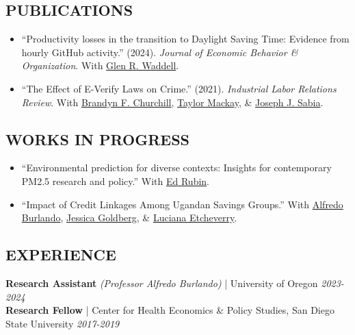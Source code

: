\documentclass[11pt]{article}
\begin{document}

\subsection*{PUBLICATIONS}
\begin{itemize}[itemsep=0ex, topsep=0em, leftmargin=0em]
  \item[] “Productivity losses in the transition to Daylight Saving Time: Evidence from hourly GitHub activity.” (2024). \textit{Journal of Economic Behavior \& Organization}. With \href{https://glenwaddell.com}{Glen R. Waddell}.
  \item[] “The Effect of E-Verify Laws on Crime.” (2021). \textit{Industrial Labor Relations Review}. With \href{https://brandynchurchill.com/}{Brandyn F. Churchill}, \href{https://tmackay.io/}{Taylor Mackay}, \& \href{https://economics.sdsu.edu/faculty/sabia}{Joseph J. Sabia}.
\end{itemize}


\subsection*{WORKS IN PROGRESS}
\begin{itemize}[itemsep=0ex, topsep=0em, leftmargin=0em]
  \item[] “Environmental prediction for diverse contexts: Insights for contemporary PM2.5 research and policy.” With \href{https://edrub.in}{Ed Rubin}.
  \item[] “Impact of Credit Linkages Among Ugandan Savings Groups.” With \href{https://www.alfredoburlando.com/}{Alfredo Burlando}, \href{https://econweb.umd.edu/~goldberg/index.html}{Jessica Goldberg}, \& \href{https://blogs.iadb.org/igualdad/en/author/lucianaetcheverry/}{Luciana Etcheverry}.
\end{itemize}


\subsection*{EXPERIENCE}
\textbf{Research Assistant} \textit{(Professor Alfredo Burlando)} | University of Oregon \hfill \textit{2023-2024} \\
\textbf{Research Fellow} | Center for Health Economics \& Policy Studies, San Diego State University \hfill \textit{2017-2019} \\
\end{document}
